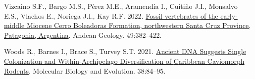 \documentclass[
  9pt,
  letterpaper,
]{article}
\newlength{\cslhangindent}
\newenvironment{CSLReferences}[2] %
 {\begin{list}{}{%
  \setlength{\itemindent}{0pt}
  \setlength{\leftmargin}{0pt}
  \setlength{\parsep}{0pt}
  \ifodd #1
   \setlength{\leftmargin}{\cslhangindent}
   \setlength{\itemindent}{-1\cslhangindent}
  \fi
  \setlength{\itemsep}{#2\baselineskip}}}
 {\end{list}}
\begin{document}
\begin{CSLReferences}{1}{1}
Vizcaino S.F., Bargo M.S., Pérez M.E., Aramendía I., Cuitiño J.I.,
Monsalvo E.S., Vlachos E., Noriega J.I., Kay R.F. 2022.
\href{https://doi.org/10.5027/andgeoV49n3-3425}{Fossil vertebrates of
the early-middle Miocene Cerro Boleadoras Formation, northwestern Santa
Cruz Province, Patagonia, Argentina}. Andean Geology. 49:382--422.

Woods R., Barnes I., Brace S., Turvey S.T. 2021.
\href{https://doi.org/10.1093/molbev/msaa189}{{A}ncient {D}{N}{A}
{S}uggests {S}ingle {C}olonization and {W}ithin-{A}rchipelago
{D}iversification of {C}aribbean {C}aviomorph {R}odents}. Molecular
Biology and Evolution. 38:84--95.

\end{CSLReferences}
\end{document}
